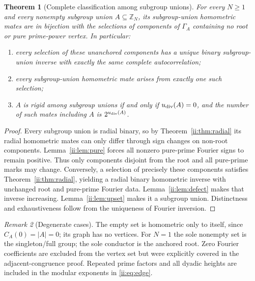 \documentclass[11pt]{article}
\numberwithin{equation}{section}
\newtheorem{theorem}{Theorem}[section]
\theoremstyle{definition}
\theoremstyle{remark}
\newtheorem{remark}[theorem]{Remark}
\begin{document}
\begin{theorem}[Complete classification among subgroup unions]\label{ii:thm:subgroups}
For every $N\ge1$ and every nonempty subgroup union $A\subseteq\mathbb Z_N$, its subgroup-union homometric mates are in bijection with the selections of components of $\Gamma_A$ containing no root or pure prime-power vertex.  In particular:
\begin{enumerate}[label=(\alph*),nosep]
\item every selection of these \emph{unanchored} components has a unique binary subgroup-union inverse with exactly the same complete autocorrelation;
\item every subgroup-union homometric mate arises from exactly one such selection;
\item $A$ is rigid among subgroup unions if and only if $u_{\rm div}(A)=0$, and the number of such mates including $A$ is $2^{u_{\rm div}(A)}$.
\end{enumerate}
\end{theorem}
\begin{proof}
Every subgroup union is radial binary, so by Theorem~\ref{ii:thm:radial} its radial homometric mates can only differ through sign changes on non-root components.  Lemma~\ref{ii:lem:pure} forces all nonzero pure-prime Fourier signs to remain positive.  Thus only components disjoint from the root and all pure-prime marks may change.  Conversely, a selection of precisely these components satisfies Theorem~\ref{ii:thm:radial}, yielding a radial binary homometric inverse with unchanged root and pure-prime Fourier data.  Lemma~\ref{ii:lem:defect} makes that inverse increasing.  Lemma~\ref{ii:lem:upset} makes it a subgroup union.  Distinctness and exhaustiveness follow from the uniqueness of Fourier inversion.\qedhere
\end{proof}

\begin{remark}[Degenerate cases]\label{ii:rem:degenerate}
The empty set is homometric only to itself, since $C_A(0)=|A|=0$; its graph has no vertices.  For $N=1$ the sole nonempty set is the singleton/full group; the sole conductor is the anchored root.  Zero Fourier coefficients are excluded from the vertex set but were explicitly covered in the adjacent-congruence proof.  Repeated prime factors and all dyadic heights are included in the modular exponents in \eqref{ii:eq:edge}.
\end{remark}


\end{document}
